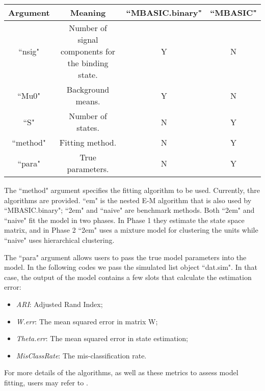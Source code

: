 \documentclass[a4paper,10pt]{article}
\begin{document}
\begin{center}
\begin{tabular}{cccc}
  \hline
  Argument & Meaning & ``MBASIC.binary" & ``MBASIC" \\
  \hline
  ``nsig" & Number of signal components for the binding state. & Y & N \\
  ``Mu0" & Background means. & Y & N \\
  ``S" & Number of states. & N & Y \\
  ``method" & Fitting method. & N & Y\\
  ``para" & True parameters. & N & Y \\
  \hline
\end{tabular}
\end{center}
 
The ``method" argument specifies the fitting algorithm to be used. Currently, thre algorithms are provided. ``em" is the nested E-M algorithm that is also used by ``MBASIC.binary"; ``2em" and ``naive" are benchmark methods. Both ``2em" and ``naive" fit the model in two phases. In Phase 1 they estimate the state space matrix, and in Phase 2 ``2em" uses a mixture model for clustering the units while ``naive" uses hierarchical clustering.

The ``para" argument allows users to pass the true model parameters into the model. In the following codes we pass the simulated list object ``dat.sim". In that case, the output of the model contains a few slots that calculate the estimation error:

\begin{itemize}
\item \textit{ARI}: Adjusted Rand Index;
\item \textit{W.err}: The mean squared error in matrix W;
\item \textit{Theta.err}: The mean squared error in state estimation;
\item \textit{MisClassRate}: The mis-classification rate.
\end{itemize}
 
For more details of the algorithms, as well as these metrics to assess model fitting, users may refer to \cite{zuo14}.

\begin{Schunk}
\end{Schunk}
\end{document}
